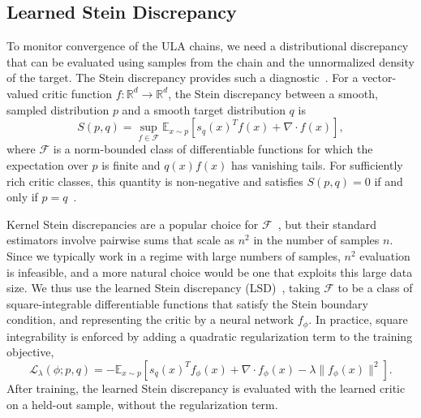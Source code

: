 \documentclass[11pt]{article}
\begin{document}
\subsection{Learned Stein Discrepancy}
To monitor convergence of the ULA chains, we need a distributional discrepancy that can be evaluated using samples from the chain and the unnormalized density of the target.
The Stein discrepancy provides such a diagnostic~\cite{gorham2015measuring,anastasiou2023stein}.
For a vector-valued critic function $f:\mathbb{R}^d\to\mathbb{R}^d$, the Stein discrepancy between a smooth, sampled distribution $p$ and a smooth target distribution $q$ is
\begin{equation} \label{stein_discrepancy}
  S(p,q) = \sup_{f \in \mathcal{F}} \mathbb{E}_{x\sim p} \left[s_q(x)^T f(x) + \nabla \cdot f(x)\right],
\end{equation}
where $\mathcal{F}$ is a norm-bounded class of differentiable functions for which the expectation over $p$ is finite and $q(x) f(x)$ has vanishing tails.
For sufficiently rich critic classes, this quantity is non-negative and satisfies $S(p,q)=0$ if and only if $p=q$~\cite{stein2004use}.

Kernel Stein discrepancies are a popular choice for $\mathcal{F}$~\cite{liu2016kernelized,chwialkowski2016kernel,gorham2017measuring}, but their standard estimators involve pairwise sums that scale as $n^2$ in the number of samples $n$. 
Since we typically work in a regime with large numbers of samples, $n^2$ evaluation is infeasible, and a more natural choice would be one that exploits this large data size. 
We thus use the learned Stein discrepancy (LSD)~\cite{hu2018stein,grathwohl2020learning}, taking $\mathcal{F}$ to be a class of square-integrable differentiable functions that satisfy the Stein boundary condition, and representing the critic by a neural network $f_\phi$.
In practice, square integrability is enforced by adding a quadratic regularization term to the training objective,
\begin{equation} \label{LSD}
  \mathcal{L}_\lambda(\phi; p,q) = - \mathbb{E}_{x\sim p} \left[s_q(x)^T f_\phi(x) + \nabla \cdot f_\phi(x) - \lambda \lVert f_\phi(x) \rVert^2 \right].
\end{equation}
After training, the learned Stein discrepancy is evaluated with the learned critic on a held-out sample, without the regularization term.
\end{document}
